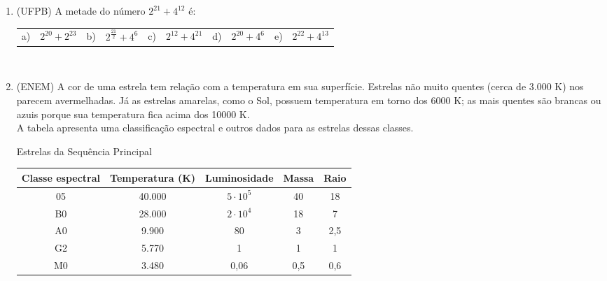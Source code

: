 \documentclass[a4paper, 11pt]{article}
\begin{document}
    \begin{enumerate}
        \item (UFPB) A metade do número $2^{21}+4^{12}$ é:\\[1.5ex]
        \begin{tabularx}{\textwidth}{lXlXlXlXlX}
            a) & $2^{20}+2^{23}$ &
            b) & $2^{\frac{21}{2}}+4^6$ &
            c) & $2^{12}+4^{21}$ &
            d) & $2^{20}+4^6$ &
            e) & $2^{22}+4^{13}$ \\
        \end{tabularx}\\[2ex]

        \item (ENEM) A cor de uma estrela tem relação com a temperatura em sua superfície.
        Estrelas não muito quentes (cerca de 3.000 K) nos parecem avermelhadas. Já as estrelas amarelas, como o Sol,
        possuem temperatura em torno dos 6000 K; as mais quentes são brancas ou azuis porque sua temperatura
        fica acima dos 10000 K.\\
        A tabela apresenta uma classificação espectral e outros dados para as estrelas dessas classes.\\
        \begin{center}
            Estrelas da Sequência Principal \\
        \end{center}
        \begin{table}[h!]
            \centering
            \begin{tabular}{ccccc}
                \toprule
                \textbf{Classe espectral} & \textbf{Temperatura (K)} & \textbf{Luminosidade} & \textbf{Massa} & \textbf{Raio} \\
                \midrule
                05                        & 40.000                   & $5\cdot 10^5$         & 40             & 18            \\
                B0                        & 28.000                   & $2\cdot 10^4$         & 18             & 7             \\
                A0                        & 9.900                    & 80                    & 3              & 2,5           \\
                G2                        & 5.770                    & 1                     & 1              & 1             \\
                M0                        & 3.480                    & 0,06                  & 0,5            & 0,6           \\

\end{tabular}
\end{table}
\end{enumerate}
\end{document}
